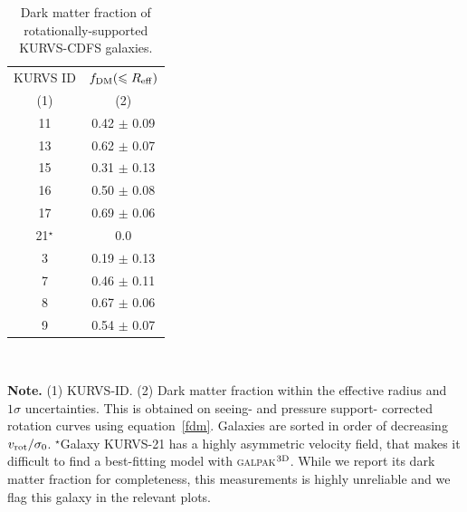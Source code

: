 \begin{table}
\centering
\caption{Dark matter fraction of rotationally-supported KURVS-CDFS galaxies.}
\label{tab3:fdm}
\begin{tabular}{cc} 
\hline
\hline
KURVS ID & $f_{\rm DM}(\leqslant R_{\rm eff})$  \\
(1) & (2) \\
\hline
11 & 0.42 $\pm$ 0.09 \\
13 & 0.62 $\pm$ 0.07 \\
15 & 0.31 $\pm$ 0.13 \\
16 & 0.50 $\pm$ 0.08 \\
17 & 0.69 $\pm$ 0.06 \\
21$^{\star}$ & 0.0  \\
3 & 0.19 $\pm$ 0.13 \\
7 & 0.46 $\pm$ 0.11 \\
8 & 0.67 $\pm$ 0.06 \\
9 & 0.54 $\pm$ 0.07 \\
\hline
\hline
\end{tabular}
\\[2mm] %
\begin{flushleft}
{\bf Note.} 
(1) KURVS-ID. 
(2) Dark matter fraction within the effective radius and $1 \sigma$ uncertainties. This is obtained on seeing- and pressure support- corrected rotation curves using equation~\ref{fdm}. Galaxies are sorted in order of decreasing $v_{\rm rot}/\sigma_0$. 
$^{\star}$Galaxy KURVS-21 has a highly asymmetric velocity field, that makes it difficult to find a best-fitting model with \textsc{galpak$^{\rm 3D}$}. 
While we report its dark matter fraction for completeness, this measurements is highly unreliable and we flag this galaxy in the relevant plots.
\end{flushleft}
\end{table}
